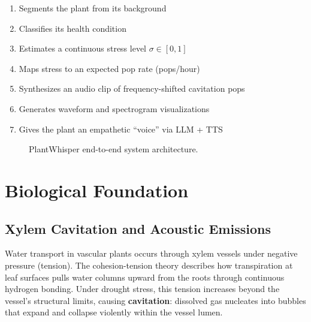 \documentclass[11pt,a4paper,twocolumn]{article}
\begin{document}
\begin{enumerate}[nosep]
    \item Segments the plant from its background
    \item Classifies its health condition
    \item Estimates a continuous stress level $\sigma \in [0, 1]$
    \item Maps stress to an expected pop rate (pops/hour)
    \item Synthesizes an audio clip of frequency-shifted cavitation pops
    \item Generates waveform and spectrogram visualizations
    \item Gives the plant an empathetic ``voice'' via LLM + TTS
\end{enumerate}

\begin{figure}[H]
    \centering
    \caption{PlantWhisper end-to-end system architecture.}
    \label{fig:architecture}
\end{figure}


\section{Biological Foundation}
\label{sec:biology}

\subsection{Xylem Cavitation and Acoustic Emissions}

Water transport in vascular plants occurs through xylem vessels under negative pressure (tension). The cohesion-tension theory \cite{dixon1894} describes how transpiration at leaf surfaces pulls water columns upward from the roots through continuous hydrogen bonding. Under drought stress, this tension increases beyond the vessel's structural limits, causing \textbf{cavitation}: dissolved gas nucleates into bubbles that expand and collapse violently within the vessel lumen.
\end{document}
